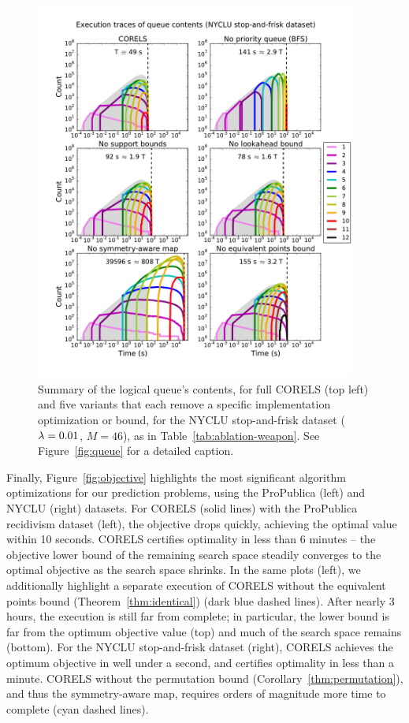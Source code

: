 \begin{figure}[t!]
\begin{center}
\includegraphics[trim={15mm 20mm 5mm 25mm},
width=0.94\textwidth]{figs/weapon_ablation-queue.pdf}
\end{center}
\vspace{-5mm}
\caption{Summary of the logical queue's contents, for full CORELS (top left)
and five variants that each remove a specific implementation optimization or bound,
for the NYCLU stop-and-frisk dataset (${{\lambda} = 0.01}$, ${M = 46}$), as in Table~\ref{tab:ablation-weapon}.
%
See Figure~\ref{fig:queue} for a detailed caption.
}
\label{fig:queue-weapon}
\end{figure}

Finally, Figure~\ref{fig:objective} highlights the most significant
algorithm optimizations for our prediction problems,
using the ProPublica (left) and NYCLU (right) datasets.
%
For CORELS (solid lines) with the ProPublica recidivism dataset (left),
the objective drops quickly, achieving the optimal value within 10 seconds.
CORELS certifies optimality in less than 6 minutes --
the objective lower bound of the remaining search space
steadily converges to the optimal objective as the search space shrinks.
%
In the same plots (left), we additionally highlight a separate execution of CORELS
without the equivalent points bound (Theorem~\ref{thm:identical}) (dark blue dashed lines).
%
After nearly 3 hours, the execution is still far from complete;
in particular, the lower bound is far from the optimum objective value (top)
and much of the search space remains (bottom).
%
For the NYCLU stop-and-frisk dataset (right),
CORELS achieves the optimum objective in well under a second,
and certifies optimality in less than a minute.
%
CORELS without the permutation bound (Corollary~\ref{thm:permutation}),
and thus the symmetry-aware map, requires orders of magnitude more time to complete
(cyan dashed lines).

